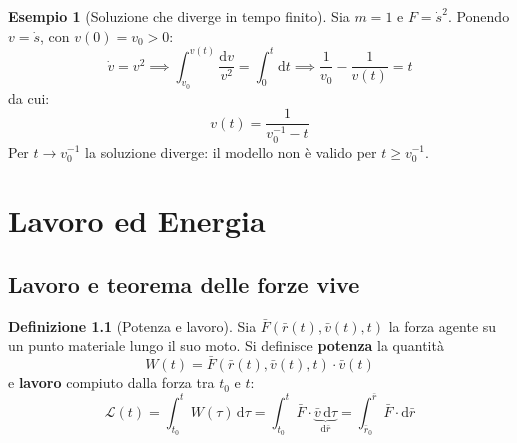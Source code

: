 \documentclass[11pt, a4paper, openright]{book}
\theoremstyle{plain}
\theoremstyle{definition}
\newtheorem{definizione}[teorema]{Definizione}
\newtheorem{esempio}[teorema]{Esempio}
\theoremstyle{remark}
\begin{document}
\begin{esempio}[Soluzione che diverge in tempo finito]
    Sia $m = 1$ e $F = \dot{s}^2$. Ponendo $v = \dot{s}$, con $v(0) = v_0 > 0$:
    \begin{equation}
        \dot{v} = v^2 \implies \int_{v_0}^{v(t)} \frac{\mathrm{d}v}{v^2} = \int_{0}^{t} \mathrm{d}t \implies \frac{1}{v_0} - \frac{1}{v(t)} = t
    \end{equation}
    da cui:
    \begin{equation}
        v(t) = \frac{1}{v_0^{-1} - t}
    \end{equation}
    Per $t \to v_0^{-1}$ la soluzione diverge: il modello non è valido per $t \geq v_0^{-1}$.
\end{esempio}

\chapter{Lavoro ed Energia}

\section{Lavoro e teorema delle forze vive}

\begin{definizione}[Potenza e lavoro]
    Sia $\bar{F}(\bar{r}(t), \bar{v}(t), t)$ la forza agente su un punto materiale lungo il suo moto. Si definisce \textbf{potenza} la quantità
    \begin{equation}
        W(t) = \bar{F}(\bar{r}(t), \bar{v}(t), t) \cdot \bar{v}(t)
    \end{equation}
    e \textbf{lavoro} compiuto dalla forza tra $t_0$ e $t$:
    \begin{equation}
        \mathcal{L}(t) = \int_{t_0}^{t} W(\tau)\, \mathrm{d}\tau = \int_{t_0}^{t} \bar{F} \cdot \underbrace{\bar{v}\, \mathrm{d}\tau}_{\mathrm{d}\bar{r}} = \int_{\bar{r}_0}^{\bar{r}} \bar{F} \cdot \mathrm{d}\bar{r}
    \end{equation}
\end{definizione}
\end{document}
